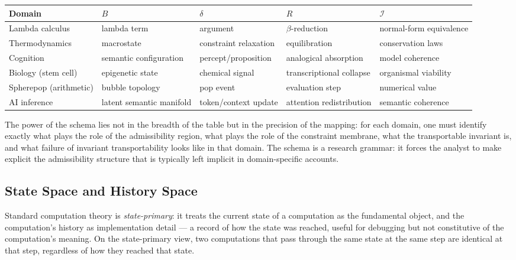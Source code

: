 \documentclass[12pt,openany]{book}
\theoremstyle{plain}
\theoremstyle{definition}
\theoremstyle{remark}
\begin{document}
\medskip
\begin{center}
\renewcommand{\arraystretch}{1.35}
\begin{tabular}{@{}lllll@{}}
\toprule
\textbf{Domain} & $B$ & $\delta$ & $R$ & $\mathcal{I}$ \\
\midrule
Lambda calculus & lambda term & argument & $\beta$-reduction & normal-form equivalence \\
Thermodynamics & macrostate & constraint relaxation & equilibration & conservation laws \\
Cognition & semantic configuration & percept/proposition & analogical absorption & model coherence \\
Biology (stem cell) & epigenetic state & chemical signal & transcriptional collapse & organismal viability \\
Spherepop (arithmetic) & bubble topology & pop event & evaluation step & numerical value \\
AI inference & latent semantic manifold & token/context update & attention redistribution & semantic coherence \\
\bottomrule
\end{tabular}
\end{center}
\medskip

The power of the schema lies not in the breadth of the table but in the precision of the mapping: for each domain, one must identify exactly what plays the role of the admissibility region, what plays the role of the constraint membrane, what the transportable invariant is, and what failure of invariant transportability looks like in that domain. The schema is a research grammar: it forces the analyst to make explicit the admissibility structure that is typically left implicit in domain-specific accounts.

\subsection*{State Space and History Space}

Standard computation theory is \emph{state-primary}: it treats the current state of a computation as the fundamental object, and the computation's history as implementation detail — a record of how the state was reached, useful for debugging but not constitutive of the computation's meaning. On the state-primary view, two computations that pass through the same state at the same step are identical at that step, regardless of how they reached that state.
\end{document}
